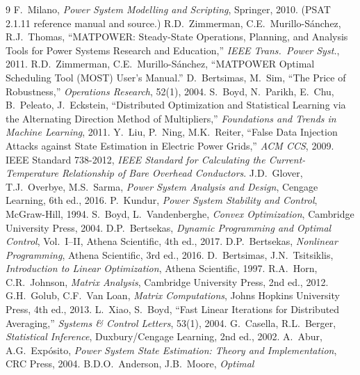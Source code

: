 \documentclass[11pt]{report}
\theoremstyle{plain}
\theoremstyle{definition}
\theoremstyle{remark}
\begin{document}
\begin{thebibliography}{9}
 F.~Milano, \emph{Power System Modelling and Scripting},
  Springer, 2010. (PSAT 2.1.11 reference manual and source.)
 R.D.~Zimmerman, C.E.~Murillo-S\'anchez, R.J.~Thomas,
  ``MATPOWER: Steady-State Operations, Planning, and Analysis Tools for
  Power Systems Research and Education,'' \emph{IEEE Trans.\ Power
  Syst.}, 2011.
 R.D.~Zimmerman, C.E.~Murillo-S\'anchez, ``MATPOWER
  Optimal Scheduling Tool (MOST) User's Manual.''
 D.~Bertsimas, M.~Sim, ``The Price of Robustness,''
  \emph{Operations Research}, 52(1), 2004.
 S.~Boyd, N.~Parikh, E.~Chu, B.~Peleato, J.~Eckstein,
  ``Distributed Optimization and Statistical Learning via the Alternating
  Direction Method of Multipliers,'' \emph{Foundations and Trends in
  Machine Learning}, 2011.
 Y.~Liu, P.~Ning, M.K.~Reiter, ``False Data Injection
  Attacks against State Estimation in Electric Power Grids,'' \emph{ACM
  CCS}, 2009.
 IEEE Standard 738-2012, \emph{IEEE Standard for
  Calculating the Current-Temperature Relationship of Bare Overhead
  Conductors}.
 J.D.~Glover, T.J.~Overbye, M.S.~Sarma, \emph{Power
  System Analysis and Design}, Cengage Learning, 6th ed., 2016.
 P.~Kundur, \emph{Power System Stability and Control},
  McGraw-Hill, 1994.
 S.~Boyd, L.~Vandenberghe, \emph{Convex
  Optimization}, Cambridge University Press, 2004.
 D.P.~Bertsekas, \emph{Dynamic Programming and
  Optimal Control}, Vol.\ I--II, Athena Scientific, 4th ed., 2017.
 D.P.~Bertsekas, \emph{Nonlinear Programming},
  Athena Scientific, 3rd ed., 2016.
 D.~Bertsimas, J.N.~Tsitsiklis,
  \emph{Introduction to Linear Optimization}, Athena Scientific, 1997.
 R.A.~Horn, C.R.~Johnson, \emph{Matrix Analysis},
  Cambridge University Press, 2nd ed., 2012.
 G.H.~Golub, C.F.~Van Loan, \emph{Matrix
  Computations}, Johns Hopkins University Press, 4th ed., 2013.
 L.~Xiao, S.~Boyd, ``Fast Linear Iterations
  for Distributed Averaging,'' \emph{Systems \& Control Letters}, 53(1),
  2004.
 G.~Casella, R.L.~Berger, \emph{Statistical
  Inference}, Duxbury/Cengage Learning, 2nd ed., 2002.
 A.~Abur, A.G.~Exp\'osito, \emph{Power System
  State Estimation: Theory and Implementation}, CRC Press, 2004.
 B.D.O.~Anderson, J.B.~Moore, \emph{Optimal
}
\end{thebibliography}
\end{document}
